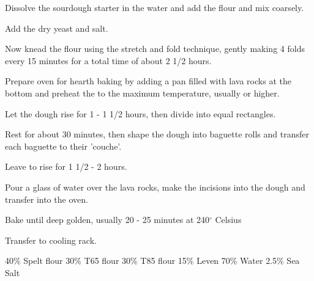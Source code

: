 \begin{method}		
     	Dissolve the sourdough starter in the water and add the flour and mix coarsely.

	Add the dry yeast and salt.

	Now knead the flour using the stretch and fold technique, gently making 4 folds  every 15 minutes for a total time of about 2 1/2 hours.

	Prepare oven for hearth baking by adding a pan filled with lava rocks at the bottom and preheat the to the maximum temperature, usually  or higher.

	Let the dough rise for 1 - 1 1/2 hours, then divide into equal rectangles.

	Rest for about 30 minutes, then shape the dough into baguette rolls and transfer each baguette to their 'couche'.

	Leave to rise for 1 1/2 - 2 hours.

	Pour a glass of water over the lava rocks, make the incisions into the dough and transfer into the oven.

	Bake until deep golden,  usually 20 - 25 minutes at 240$^{\circ}$ Celsius

	Transfer to cooling rack.

\end {method}

\label{rec:spelt-loaf}

\begin{ingreds}
	40\% Spelt flour
	30\% T65 flour
	30\% T85 flour
	15\% Leven
	70\% Water
	2.5\% Sea Salt

\end{ingreds}

